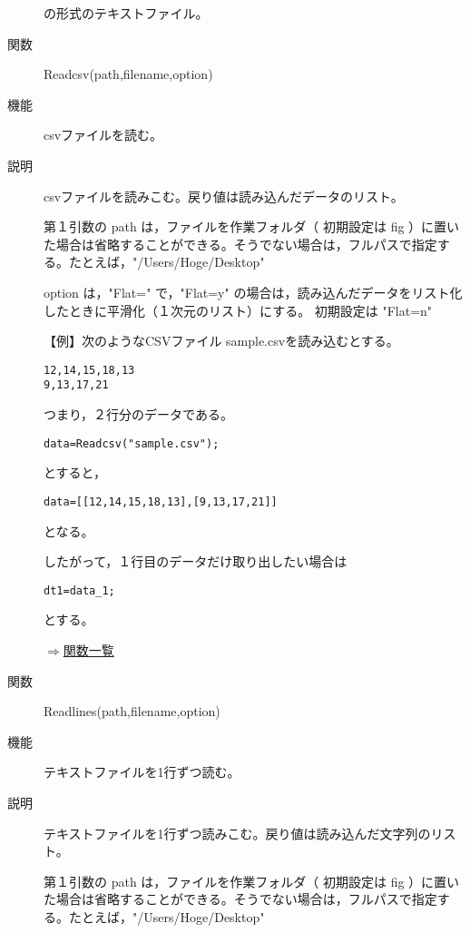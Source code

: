 \documentclass[papersize,a4paper,10pt,uplatex]{jsarticle}
\begin{document}
\begin{description}
の形式のテキストファイル。

\hypertarget{readcsv}{}
\item[関数]Readcsv(path,filename,option)
\item[機能]csvファイルを読む。
\item[説明]csvファイルを読みこむ。戻り値は読み込んだデータのリスト。

第１引数の path は，ファイルを作業フォルダ（ 初期設定は fig ）に置いた場合は省略することができる。そうでない場合は，フルパスで指定する。たとえば，"/Users/Hoge/Desktop"

option は，"Flat=" で，"Flat=y" の場合は，読み込んだデータをリスト化したときに平滑化（１次元のリスト）にする。 初期設定は "Flat=n"

【例】次のようなCSVファイル sample.csvを読み込むとする。

\begin{verbatim}
12,14,15,18,13
9,13,17,21
\end{verbatim}

つまり，２行分のデータである。

\begin{verbatim}
data=Readcsv("sample.csv");
\end{verbatim}

とすると，
\begin{verbatim}
data=[[12,14,15,18,13],[9,13,17,21]]
\end{verbatim}

となる。

したがって，１行目のデータだけ取り出したい場合は

\begin{verbatim}
dt1=data_1;
\end{verbatim}

とする。

\begin{flushright}\hyperlink{functionlist}{$\Rightarrow$関数一覧}\end{flushright}

\hypertarget{readlines}{}
\item[関数]Readlines(path,filename,option)
\item[機能]テキストファイルを1行ずつ読む。
\item[説明]テキストファイルを1行ずつ読みこむ。戻り値は読み込んだ文字列のリスト。

第１引数の path は，ファイルを作業フォルダ（ 初期設定は fig ）に置いた場合は省略することができる。そうでない場合は，フルパスで指定する。たとえば，"/Users/Hoge/Desktop"


\end{description}
\end{document}
